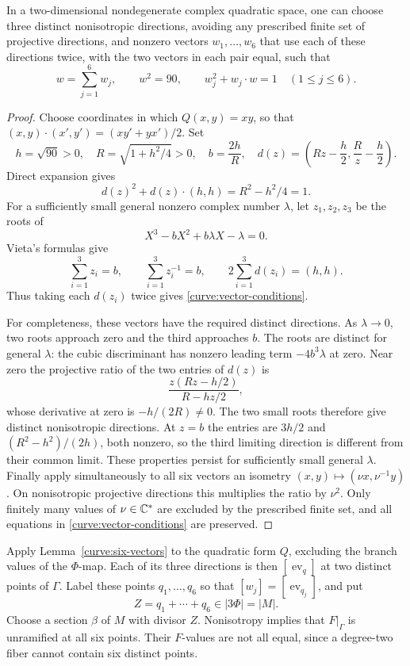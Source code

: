 \begin{lemma}\label{curve:six-vectors}
In a two-dimensional nondegenerate complex quadratic space, one can
choose three distinct nonisotropic directions, avoiding any prescribed
finite set of projective directions, and nonzero vectors
$w_1,\ldots,w_6$ that use each of these directions twice, with the two
vectors in each pair equal, such that
\begin{equation}\label{curve:vector-conditions}
  w=\sum_{j=1}^6w_j,\qquad
  w^2=90,\qquad w_j^2+w_j\mathbin{\cdot}w=1
  \quad(1\le j\le6).
\end{equation}
\end{lemma}

\begin{proof}
Choose coordinates in which $Q(x,y)=xy$, so that
$(x,y)\mathbin{\cdot}(x',y')=(xy'+yx')/2$.  Set
\[
 h=\sqrt{90}>0,\quad R=\sqrt{1+h^2/4}>0,\quad
 b=\frac{2h}{R},\quad
 d(z)=\left(Rz-\frac h2,\frac Rz-\frac h2\right).
\]
Direct expansion gives
\[
 d(z)^2+d(z)\mathbin{\cdot}(h,h)=R^2-h^2/4=1.
\]
For a sufficiently small general nonzero complex number $\lambda$,
let $z_1,z_2,z_3$ be the roots of
\[
 X^3-bX^2+b\lambda X-\lambda=0.
\]
Vieta's formulas give
\[
 \sum_{i=1}^3z_i=b,\qquad
 \sum_{i=1}^3z_i^{-1}=b,\qquad
 2\sum_{i=1}^3d(z_i)=(h,h).
\]
Thus taking each $d(z_i)$ twice gives \eqref{curve:vector-conditions}.

For completeness, these vectors have the required distinct directions.
As $\lambda\to0$, two roots approach zero and the third approaches
$b$.  The roots are distinct for general $\lambda$: the cubic
discriminant has nonzero leading term $-4b^3\lambda$ at zero.
Near zero the projective ratio of the two entries of $d(z)$ is
\[
 \frac{z(Rz-h/2)}{R-hz/2},
\]
whose derivative at zero is $-h/(2R)\ne0$.  The two small roots
therefore give distinct nonisotropic directions.  At $z=b$ the entries
are $3h/2$ and $(R^2-h^2)/(2h)$, both nonzero, so the third limiting
direction is different from their common limit.  These properties
persist for sufficiently small general $\lambda$.  Finally apply
simultaneously to all six vectors an isometry
$(x,y)\mapsto(\nu x,\nu^{-1}y)$.  On nonisotropic projective
directions this multiplies the ratio by $\nu^2$.  Only finitely many
values of $\nu\in\mathbb C^*$ are excluded by the prescribed finite set,
and all equations in \eqref{curve:vector-conditions} are preserved.
\end{proof}

Apply Lemma~\ref{curve:six-vectors} to the quadratic form $Q$, excluding
the branch values of the $\Phi$-map.  Each of its three directions is
then $[\operatorname{ev}_q]$ at two distinct points of $\Gamma$.
Label these points $q_1,\ldots,q_6$ so that
$[w_j]=[\operatorname{ev}_{q_j}]$, and put
\begin{equation}\label{curve:marked-divisor}
 Z=q_1+\cdots+q_6\in|3\Phi|=|M|.
\end{equation}
Choose a section $\beta$ of $M$ with divisor $Z$.
Nonisotropy implies that $F|_\Gamma$ is unramified at all six points.
Their $F$-values are not all equal, since a degree-two fiber cannot
contain six distinct points.

